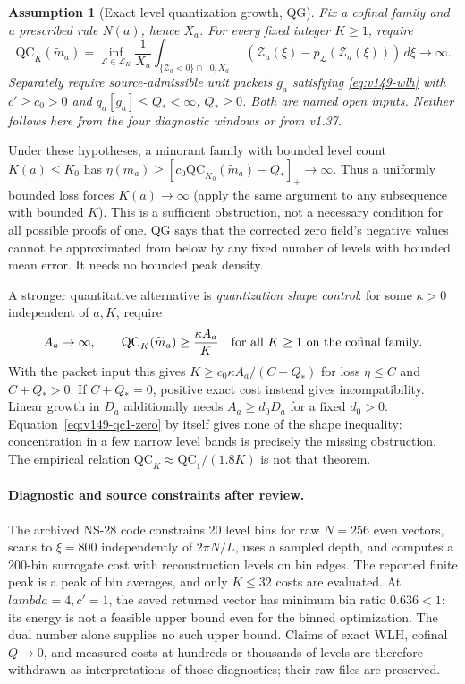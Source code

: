\documentclass[11pt]{article}
\def\lambda{lambda}%
\newtheorem{assumption}[theorem]{Assumption}
\theoremstyle{remark}
\begin{document}
\begin{assumption}[Exact level quantization growth, QG]
\label{ass:v149-qg}
Fix a cofinal family and a prescribed rule $N(a)$, hence $X_a$.
For every fixed integer $K\ge1$, require
\begin{equation}\label{eq:v149-qg}
 \mathrm{QC}_K(\widetilde m_a)
 =\inf_{\mathcal L\in\mathcal L_K}\frac1{X_a}
   \int_{\{\mathcal Z_a<0\}\cap[0,X_a]}
       (\mathcal Z_a(\xi)-p_{\mathcal L}(\mathcal Z_a(\xi)))\,d\xi
 \longrightarrow\infty.
\end{equation}
Separately require source-admissible unit packets $g_a$ satisfying
\eqref{eq:v149-wlh} with $c'\ge c_0>0$ and $q_a[g_a]\le Q_*<\infty$, $Q_*\ge0$.
Both are named open inputs. Neither follows here from the four diagnostic
windows or from v1.37.
\end{assumption}
Under these hypotheses, a minorant family with bounded level count
$K(a)\le K_0$ has
$\eta(m_a)\ge[c_0\mathrm{QC}_{K_0}(\widetilde m_a)-Q_*]_+\to\infty$.
Thus a uniformly bounded loss forces $K(a)\to\infty$ (apply the same
argument to any subsequence with bounded $K$). This is a sufficient
obstruction, not a necessary condition for all possible proofs of one.
QG says that the corrected zero field's negative values cannot be
approximated from below by any fixed number of levels with bounded
mean error. It needs no bounded peak density.

A stronger quantitative alternative is \emph{quantization shape control}:
for some $\kappa>0$ independent of $a,K$, require
\begin{equation}\label{eq:v149-shape}
 A_a\to\infty,\qquad
 \mathrm{QC}_K(\widetilde m_a)\ge\frac{\kappa A_a}{K}
 \quad\hbox{for all }K\ge1\hbox{ on the cofinal family}.
\end{equation}
With the packet input this gives
$K\ge c_0\kappa A_a/(C+Q_*)$ for loss $\eta\le C$ and $C+Q_*>0$.
If $C+Q_*=0$, positive exact cost instead gives incompatibility.
Linear growth in $D_a$ additionally needs $A_a\ge d_0D_a$ for a fixed
$d_0>0$. Equation~\eqref{eq:v149-qc1-zero} by itself gives none of the
shape inequality: concentration in a few narrow level bands is precisely
the missing obstruction. The empirical relation
$\mathrm{QC}_K\approx\mathrm{QC}_1/(1.8K)$ is not that theorem.

\paragraph{Diagnostic and source constraints after review.}
The archived NS-28 code constrains 20 level bins for raw $N=256$ even
vectors, scans to $\xi=800$ independently of $2\pi N/L$, uses a sampled
depth, and computes a 200-bin surrogate cost with reconstruction levels
on bin edges. The reported finite peak is a peak of bin averages, and
only $K\le32$ costs are evaluated. At $\lambda=4,c'=1$, the saved
returned vector has minimum bin ratio $0.636<1$: its energy is not a
feasible upper bound even for the binned optimization. The dual number
alone supplies no such upper bound. Claims of exact WLH, cofinal
$Q\to0$, and measured costs at hundreds or thousands of levels are
therefore withdrawn as interpretations of those diagnostics; their
raw files are preserved.
\end{document}
